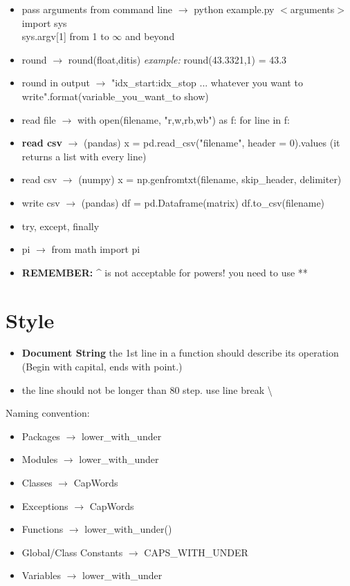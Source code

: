 \documentclass{article}
\begin{document}
\begin{multicols}{2}
\begin{itemize}
\item pass arguments from command line $\rightarrow$ python example.py $<$arguments$>$      \\
                                                import sys \\
                                                sys.argv[1]  from 1 to $\infty$ and beyond
\item round $\rightarrow$ round(float,ditis) \textit{example:} round(43.3321,1) = 43.3
\item round in output $\rightarrow$ "{idx\_start:idx\_stop} ... whatever you want to write".format(variable\_you\_want\_to show)
\item read file $\rightarrow$ with open(filename, "r,w,rb,wb") as f:
                                for line in f:
\item \textbf{read csv} $\rightarrow$ (pandas) x = pd.read\_csv("filename", header = 0).values (it returns a list with every line)
\item read csv $\rightarrow$ (numpy) x = np.genfromtxt(filename, skip\_header, delimiter)
\item write csv $\rightarrow$ (pandas) df = pd.Dataframe(matrix)
                                    df.to\_csv(filename)
\item try, except, finally
\item pi $\rightarrow$ from math import pi
\item \textbf{REMEMBER:} \^{} is not acceptable for powers! you need to use **
\end{itemize}
\section{Style}
\begin{itemize}
\item \textbf{Document String} the 1st line in a function should describe its operation (Begin with capital, ends with point.) \cite{Google}
\item the line should not be longer than 80 step. use line break \textbackslash
\end{itemize}

Naming convention:
\begin{itemize}
\item Packages $\rightarrow$ lower\_with\_under
\item Modules $\rightarrow$ lower\_with\_under
\item Classes $\rightarrow$ CapWords
\item Exceptions $\rightarrow$ CapWords
\item Functions $\rightarrow$ lower\_with\_under()
\item Global/Class Constants $\rightarrow$ CAPS\_WITH\_UNDER
\item Variables $\rightarrow$ lower\_with\_under
\end{itemize}

\end{multicols}
\end{document}
